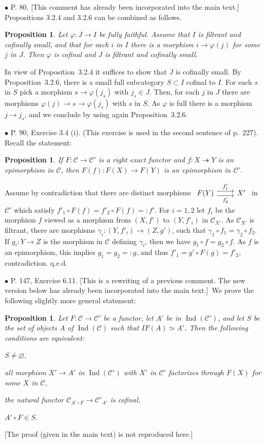 \documentclass[12pt]{article}
\newtheorem{prop}[thm]{Proposition}
\theoremstyle{remark}
\newcommand{\bu}{\bullet}
\newcommand{\n}{\noindent}
\newcommand{\cc}{\mathcal}
\newcommand{\C}{\mathcal C}
\newcommand{\epi}{\twoheadrightarrow}
\newcommand{\p}{\varphi}
\newcommand{\pr}{Proposition}
\newcommand{\rw}{[This is a rewriting of a previous comment. The new version below has already been incorporated into the main text.]}
\DeclareMathOperator{\Ind}{Ind}
\begin{document}

\n$\bu$ P. 80. [This comment has already been incorporated into the main text.] \pr s 3.2.4 and 3.2.6 can be combined as follows. 

\begin{prop}\label{comb} 
Let $\p:J\to I$ be fully faithful. Assume that $I$ is filtrant and cofinally small, and that for each $i$ in $I$ there is a morphism $i\to\p(j)$ for some $j$ in $J$. Then $\p$ is cofinal and $J$ is filtrant and cofinally small. 
\end{prop} 

\n{\em Proof.} In view of \pr\ 3.2.4 it suffices to show that $J$ is cofinally small. By \pr\ 3.2.6, there is a small full subcategory $S\subset I$ cofinal to $I$. For each $s$ in $S$ pick a morphism $s\to\p(j_s)$ with $j_s\in J$. Then, for each $j$ in $J$ there are morphisms $\p(j)\to s\to\p(j_s)$ with $s$ in $S$. As $\p$ is full there is a morphism $j\to j_s$, and we conclude by using again \pr\ 3.2.6. 


\n$\bu$ P. 90, Exercise 3.4 (i). (This exercise is used in the second sentence of p.~227). Recall the statement: 
%
\begin{prop}\label{34i}
If $F:\C\to\C'$ is a right exact functor and $f:X\epi Y$ is an epimorphism in $\C$, then $F(f):F(X)\to F(Y)$ is an epimorphism in $\C'$.
\end{prop}
%
\n{\em Proof.} Assume by contradiction that there are distinct morphisms $\begin{tikzcd}F(Y)\ar[yshift=.7ex]{r}{f'_1}\ar[yshift=-.7ex]{r}[swap]{f'_2}&X'\end{tikzcd}$ in $\C'$ which satisfy 
$
f'_1\circ F(f)=f'_2\circ F(f)=:f'.
$ 
For $i=1,2$ let $f_i$ be the morphism $f$ viewed as a morphism from $(X,f')$ to $(Y,f'_i)$ in $\C_{X'}$. As $\C_{X'}$ is filtrant, there are morphisms $\gamma_i:(Y,f'_i)\to(Z,g')$, such that $\gamma_1\circ f_1=\gamma_2\circ f_2$. If $g_i:Y\to Z$ is the morphism in $\C$ defining $\gamma_i$, then we have $g_1\circ f=g_2\circ f$. As $f$ is an epimorphism, this implies $g_1=g_2=:g$, and thus $f'_1=g'\circ F(g)=f'_2$, contradiction. q.e.d.


\n$\bu$ P. 147, Exercise 6.11. \rw\ We prove the following slightly more general statement: 
% 
\begin{prop}
%
Let $F:\cc C\to\cc C'$ be a functor, let $A'$ be in $\Ind(\cc C')$, and let $S$ be the set of objects $A$ of $\Ind(\cc C)$ such that $IF(A)\simeq A'$. Then the following conditions are equivalent: 

\n{\em(a)} $S\neq\varnothing$, 

\n{\em(b)} all morphism $X'\to A'$ in $\Ind(\cc C')$ with $X'$ in $\cc C'$ factorizes through $F(X)$ for some $X$ in $\cc C$, 

\n{\em(c)} the natural functor $\cc C_{A'\circ F}\to\cc C'_{A'}$ is cofinal, 

\n{\em(d)} $A'\circ F\in S$.
%
\end{prop}
%
[The proof (given in the main text) is not reproduced here.]\bigskip 
\end{document}
